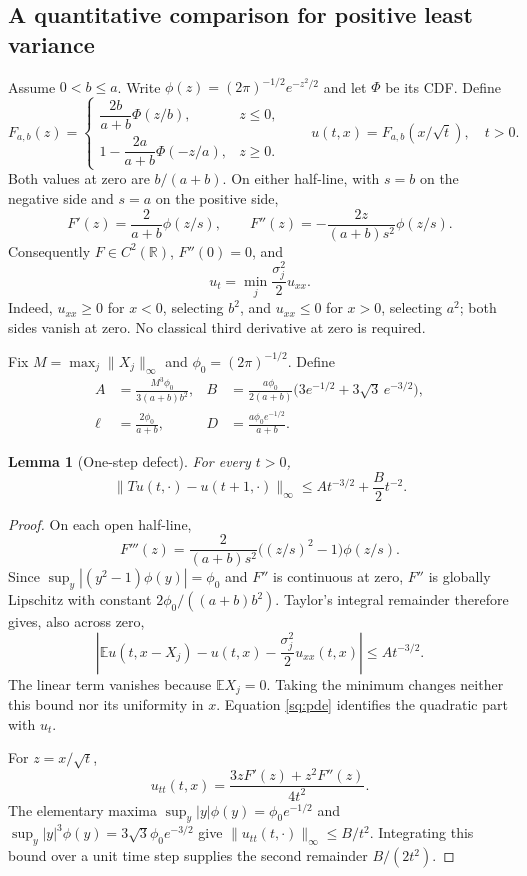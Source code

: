 \documentclass[11pt,a4paper]{article}
\newtheorem{lemma}[theorem]{Lemma}
\theoremstyle{definition}\newtheorem{definition}[theorem]{Definition}
\theoremstyle{remark}\newtheorem{remark}[theorem]{Remark}
\newcommand{\E}{\mathbb E}
\newcommand{\R}{\mathbb R}
\numberwithin{equation}{section}
\begin{document}
\subsection{A quantitative comparison for positive least variance}
Assume $0<b\le a$. Write $\phi(z)=(2\pi)^{-1/2}e^{-z^2/2}$ and let $\Phi$
be its CDF. Define
\begin{equation}\label{sq:profile}
 F_{a,b}(z)=
 \begin{cases}
 \dfrac{2b}{a+b}\Phi(z/b),&z\le0,\\[3pt]
 1-\dfrac{2a}{a+b}\Phi(-z/a),&z\ge0.
 \end{cases}
 \qquad u(t,x)=F_{a,b}(x/\sqrt t),\quad t>0.
\end{equation}
Both values at zero are $b/(a+b)$. On either half-line, with $s=b$ on the
negative side and $s=a$ on the positive side,
\[
 F'(z)=\frac{2}{a+b}\phi(z/s),\qquad
 F''(z)=-\frac{2z}{(a+b)s^2}\phi(z/s).
\]
Consequently $F\in C^2(\R)$, $F''(0)=0$, and
\begin{equation}\label{sq:pde}
 u_t=\min_j\frac{\sigma_j^2}{2}u_{xx}.
\end{equation}
Indeed, $u_{xx}\ge0$ for $x<0$, selecting $b^2$, and $u_{xx}\le0$ for $x>0$,
selecting $a^2$; both sides vanish at zero. No classical third derivative at
zero is required.

Fix $M=\max_j\|X_j\|_\infty$ and $\phi_0=(2\pi)^{-1/2}$. Define
\begin{align*}
 A&=\frac{M^3\phi_0}{3(a+b)b^2},&
 B&=\frac{a\phi_0}{2(a+b)}
       \bigl(3e^{-1/2}+3\sqrt3\,e^{-3/2}\bigr),\\
 \ell&=\frac{2\phi_0}{a+b},&
 D&=\frac{a\phi_0 e^{-1/2}}{a+b}.
\end{align*}

\begin{lemma}[One-step defect]\label{sq:local}
For every $t>0$,
\begin{equation}\label{sq:defect}
 \|Tu(t,\cdot)-u(t+1,\cdot)\|_\infty
 \le A t^{-3/2}+\frac B2 t^{-2}.
\end{equation}
\end{lemma}
\begin{proof}
On each open half-line,
\[
 F'''(z)=\frac{2}{(a+b)s^2}\bigl((z/s)^2-1\bigr)\phi(z/s).
\]
Since $\sup_y|(y^2-1)\phi(y)|=\phi_0$ and $F''$ is continuous at zero,
$F''$ is globally Lipschitz with constant $2\phi_0/((a+b)b^2)$.
Taylor's integral remainder therefore gives, also across zero,
\[
 \left|\E u(t,x-X_j)-u(t,x)-\frac{\sigma_j^2}{2}u_{xx}(t,x)\right|
 \le A t^{-3/2}.
\]
The linear term vanishes because $\E X_j=0$. Taking the minimum changes
neither this bound nor its uniformity in $x$. Equation \eqref{sq:pde} identifies
the quadratic part with $u_t$.

For $z=x/\sqrt t$,
\[
 u_{tt}(t,x)=\frac{3zF'(z)+z^2F''(z)}{4t^2}.
\]
The elementary maxima $\sup_y|y|\phi(y)=\phi_0e^{-1/2}$ and
$\sup_y|y|^3\phi(y)=3\sqrt3\phi_0e^{-3/2}$ give
$\|u_{tt}(t,\cdot)\|_\infty\le B/t^2$. Integrating this bound over a
unit time step supplies the second remainder $B/(2t^2)$.
\end{proof}
\end{document}
